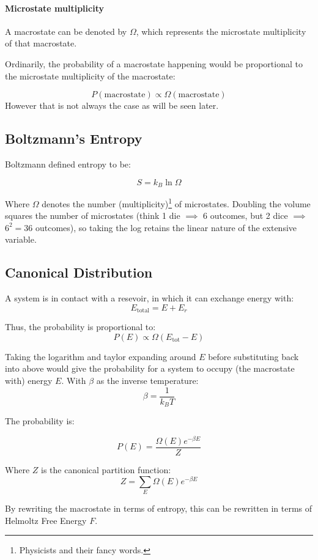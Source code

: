 \documentclass[12pt]{article}
\begin{document}
 
\paragraph{Microstate multiplicity}
A macrostate can be denoted by $\Omega$, which represents the microstate multiplicity of that macrostate. 

Ordinarily, the probability of a macrostate happening would be proportional to the microstate multiplicity of the macrostate:

\[P(\text{macrostate}) \propto \Omega(\text{macrostate})\]
However that is not always the case as will be seen later.

\subsection{Boltzmann's Entropy}

Boltzmann defined entropy to be:

\[ \boxed{S = k_B \ln{\Omega}}\]



Where $\Omega$ denotes the number (multiplicity)\footnote{Physicists and their fancy words.} of microstates. Doubling the volume squares the number of microstates (think 1 die $\implies$ 6 outcomes, but 2 dice $\implies$ $6^2=36$ outcomes), so taking the log retains the linear nature of the extensive variable.


\subsection{Canonical Distribution}

A system is in contact with a resevoir, in which it can exchange energy with:
\[ E_\text{total} = E + E_r\]

Thus, the probability is proportional to:
\[ P(E) \propto \Omega(E_\text{tot} - E)\]


Taking the logarithm and taylor expanding around $E$ before substituting back into above would give the probability for a system to occupy (the macrostate with) energy $E$. With $\beta$ as the inverse temperature:
\[\beta = \frac{1}{k_B T}\]

The probability is:

\[\boxed{P(E) = \frac{\Omega(E)e^{-\beta E}}{Z}}\]

Where $Z$ is the canonical partition function:
\[\boxed{Z = \sum_E\Omega(E)e^{-\beta E}}\]

By rewriting the macrostate in terms of entropy, this can be rewritten in terms of Helmoltz Free Energy $F$.
\end{document}
